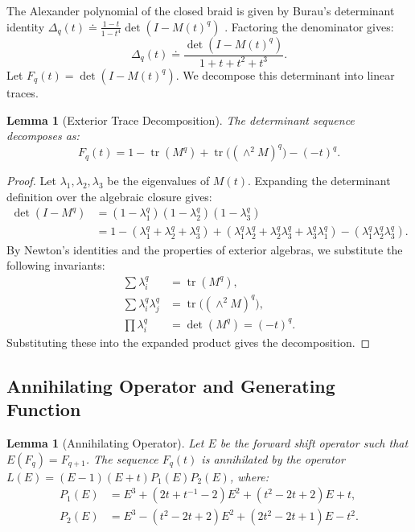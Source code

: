 \documentclass[11pt]{article}
\newtheorem{lemma}[theorem]{Lemma}
\begin{document}
The Alexander polynomial of the closed braid is given by Burau's determinant identity $\Delta_q(t) \doteq \frac{1-t}{1-t^4} \det(I - M(t)^q)$ \cite{Birman1974, Burau1936}. Factoring the denominator gives:
\begin{equation*}
\Delta_q(t) \doteq \frac{\det(I - M(t)^q)}{1+t+t^2+t^3}.
\end{equation*}
Let $F_q(t) = \det(I - M(t)^q)$. We decompose this determinant into linear traces. 

\begin{lemma}[Exterior Trace Decomposition]\label{lem:trace}
The determinant sequence decomposes as:
\begin{equation}
F_q(t) = 1 - \operatorname{tr}(M^q) + \operatorname{tr}\big((\wedge^2 M)^q\big) - (-t)^q.
\end{equation}
\end{lemma}

\begin{proof}
Let $\lambda_1, \lambda_2, \lambda_3$ be the eigenvalues of $M(t)$. Expanding the determinant definition over the algebraic closure gives:
\begin{align*}
\det(I - M^q) &= (1-\lambda_1^q)(1-\lambda_2^q)(1-\lambda_3^q) \\
&= 1 - (\lambda_1^q + \lambda_2^q + \lambda_3^q) + (\lambda_1^q\lambda_2^q + \lambda_2^q\lambda_3^q + \lambda_3^q\lambda_1^q) - (\lambda_1^q\lambda_2^q\lambda_3^q).
\end{align*}
By Newton's identities and the properties of exterior algebras, we substitute the following invariants:
\begin{align*}
\sum \lambda_i^q &= \operatorname{tr}(M^q), \\
\sum \lambda_i^q\lambda_j^q &= \operatorname{tr}\big((\wedge^2 M)^q\big), \\
\prod \lambda_i^q &= \det(M^q) = (-t)^q.
\end{align*}
Substituting these into the expanded product gives the decomposition.
\end{proof}

\subsection{Annihilating Operator and Generating Function}

\begin{lemma}[Annihilating Operator]\label{lem:annihilator}
Let $E$ be the forward shift operator such that $E(F_q) = F_{q+1}$. The sequence $F_q(t)$ is annihilated by the operator $L(E) = (E-1)(E+t)P_1(E)P_2(E)$, where:
\begin{align*}
P_1(E) &= E^3 + (2t + t^{-1} - 2)E^2 + (t^2 - 2t + 2)E + t, \\
P_2(E) &= E^3 - (t^2 - 2t + 2)E^2 + (2t^2 - 2t + 1)E - t^2.
\end{align*}
\end{lemma}
\end{document}
